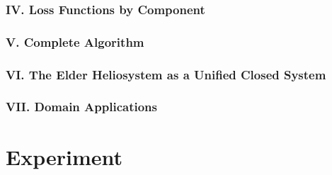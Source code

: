 \documentclass[11pt,twoside]{book}
\begin{document}
\section*{IV. Loss Functions by Component}

\section*{V. Complete Algorithm}

\section*{VI. The Elder Heliosystem as a Unified Closed System}

\section*{VII. Domain Applications}

\part{Experiment}




\backmatter
\printbibliography[title={References}]
\end{document}
